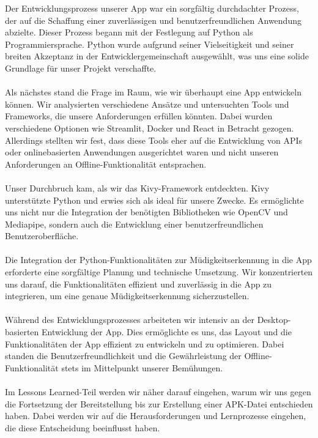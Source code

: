 		Der Entwicklungsprozess unserer App war ein sorgfältig durchdachter Prozess, der auf die Schaffung einer zuverlässigen und benutzerfreundlichen Anwendung abzielte. Dieser Prozess begann mit der Festlegung auf Python als Programmiersprache. Python wurde aufgrund seiner Vielseitigkeit und seiner breiten Akzeptanz in der Entwicklergemeinschaft ausgewählt, was uns eine solide Grundlage für unser Projekt verschaffte.
		\\\\
		Als nächstes stand die Frage im Raum, wie wir überhaupt eine App entwickeln können. Wir analysierten verschiedene Ansätze und untersuchten Tools und Frameworks, die unsere Anforderungen erfüllen könnten. Dabei wurden verschiedene Optionen wie Streamlit, Docker und React in Betracht gezogen. Allerdings stellten wir fest, dass diese Tools eher auf die Entwicklung von APIs oder onlinebasierten Anwendungen ausgerichtet waren und nicht unseren Anforderungen an Offline-Funktionalität entsprachen.
		\\\\
		Unser Durchbruch kam, als wir das Kivy-Framework entdeckten. Kivy unterstützte Python und erwies sich als ideal für unsere Zwecke. Es ermöglichte uns nicht nur die Integration der benötigten Bibliotheken wie OpenCV und Mediapipe, sondern auch die Entwicklung einer benutzerfreundlichen Benutzeroberfläche.
		\\\\
		Die Integration der Python-Funktionalitäten zur Müdigkeitserkennung in die App erforderte eine sorgfältige Planung und technische Umsetzung. Wir konzentrierten uns darauf, die Funktionalitäten effizient und zuverlässig in die App zu integrieren, um eine genaue Müdigkeitserkennung sicherzustellen.
		\\\\
		Während des Entwicklungsprozesses arbeiteten wir intensiv an der Desktop-basierten Entwicklung der App. Dies ermöglichte es uns, das Layout und die Funktionalitäten der App effizient zu entwickeln und zu optimieren. Dabei standen die Benutzerfreundlichkeit und die Gewährleistung der Offline-Funktionalität stets im Mittelpunkt unserer Bemühungen.
		\\\\
		Im Lessons Learned-Teil werden wir näher darauf eingehen, warum wir uns gegen die Fortsetzung der Bereitstellung bis zur Erstellung einer APK-Datei entschieden haben. Dabei werden wir auf die Herausforderungen und Lernprozesse eingehen, die diese Entscheidung beeinflusst haben.
		
